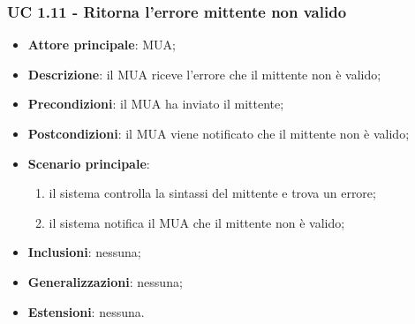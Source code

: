     \subsubsection{UC 1.11 - Ritorna l'errore mittente non valido} \label{sec:UC1.11}
    \begin{itemize}
        \item \textbf{Attore principale}: MUA;
        \item \textbf{Descrizione}: il MUA riceve l'errore che il mittente non è valido;
        \item \textbf{Precondizioni}: il MUA ha inviato il mittente;
        \item \textbf{Postcondizioni}: il MUA viene notificato che il mittente non è valido;
        \item \textbf{Scenario principale}:
            \begin{enumerate}
                \item il sistema controlla la sintassi del mittente e trova un errore;
                \item il sistema notifica il MUA che il mittente non è valido;
            \end{enumerate}
        \item \textbf{Inclusioni}: nessuna;
        \item \textbf{Generalizzazioni}: nessuna;
        \item \textbf{Estensioni}: nessuna.
    \end{itemize}



